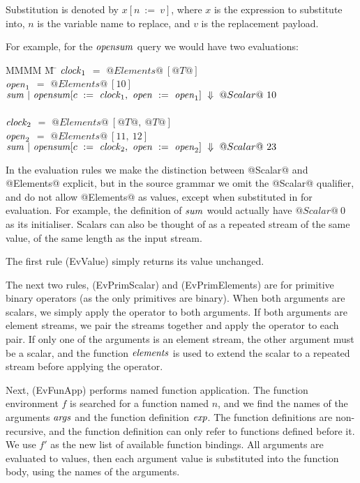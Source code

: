 Substitution is denoted by $x[n~:=~v]$, where $x$ is the expression to substitute into, $n$ is the variable name to replace, and $v$ is the replacement payload.

For example, for the $\mathit{opensum}$ query we would have two evaluations:
\begin{tabbing}
MMMM \= M \= \kill
$\mathit{clock}_1$ \> $=$ \> $@Elements@~[@T@]$ \\
$\mathit{open}_1$  \> $=$ \> $@Elements@~[10]$ \\
$\mathit{sum} ~|~ \mathit{opensum}[c~:=~\mathit{clock}_1,~\mathit{open}~:=~\mathit{open}_1] ~\Downarrow~ @Scalar@~10 $ \\
\\
$\mathit{clock}_2$ \> $=$ \> $@Elements@~[@T@,~@T@]$ \\
$\mathit{open}_2$  \> $=$ \> $@Elements@~[11,~12]$ \\
$\mathit{sum} ~|~ \mathit{opensum}[c~:=~\mathit{clock}_2,~\mathit{open}~:=~\mathit{open}_2] ~\Downarrow~ @Scalar@~23 $
\end{tabbing}

In the evaluation rules we make the distinction between @Scalar@ and @Elements@ explicit, but in the source grammar we omit the @Scalar@ qualifier, and do not allow @Elements@ as values, except when substituted in for evaluation.
For example, the definition of $\mathit{sum}$ would actually have $@Scalar@~0$ as its initialiser.
Scalars can also be thought of as a repeated stream of the same value, of the same length as the input stream.

The first rule (EvValue) simply returns its value unchanged.

The next two rules, (EvPrimScalar) and (EvPrimElements) are for primitive binary operators (as the only primitives are binary).
When both arguments are scalars, we simply apply the operator to both arguments.
If both arguments are element streams, we pair the streams together and apply the operator to each pair.
If only one of the arguments is an element stream, the other argument must be a scalar, and the function $\mathit{elements}$ is used to extend the scalar to a repeated stream before applying the operator.

Next, (EvFunApp) performs named function application.
The function environment $f$ is searched for a function named $n$, and we find the names of the arguments $\mathit{args}$ and the function definition $\mathit{exp}$.
The function definitions are non-recursive, and the function definition can only refer to functions defined before it.
We use $f'$ as the new list of available function bindings.
All arguments are evaluated to values, then each argument value is substituted into the function body, using the names of the arguments.

